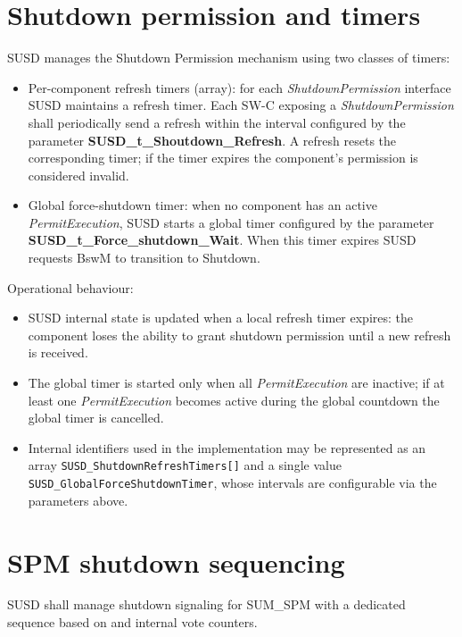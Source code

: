 \section{Shutdown permission and timers}

SUSD manages the Shutdown Permission mechanism using two classes of timers:

\begin{itemize}
\item Per-component refresh timers (array): for each \emph{ShutdownPermission} interface SUSD maintains a refresh timer. Each SW-C exposing a \emph{ShutdownPermission} shall periodically send a refresh within the interval configured by the parameter \textbf{SUSD\_t\_Shoutdown\_Refresh}. A refresh resets the corresponding timer; if the timer expires the component's permission is considered invalid.
\item Global force-shutdown timer: when no component has an active \emph{PermitExecution}, SUSD starts a global timer configured by the parameter \textbf{SUSD\_t\_Force\_shutdown\_Wait}. When this timer expires SUSD requests BswM to transition to Shutdown.
\end{itemize}

Operational behaviour:
\begin{itemize}
\item SUSD internal state is updated when a local refresh timer expires: the component loses the ability to grant shutdown permission until a new refresh is received.
\item The global timer is started only when all \emph{PermitExecution} are inactive; if at least one \emph{PermitExecution} becomes active during the global countdown the global timer is cancelled.
\item Internal identifiers used in the implementation may be represented as an array \texttt{SUSD_ShutdownRefreshTimers[]} and a single value \texttt{SUSD_GlobalForceShutdownTimer}, whose intervals are configurable via the parameters above.
\end{itemize}

\section{SPM shutdown sequencing}
SUSD shall manage shutdown signaling for SUM\_SPM with a dedicated sequence based on  and internal vote counters.

